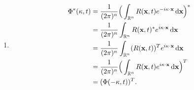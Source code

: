 \documentclass[mat2, tisk]{fmfdelo}
\newcommand{\R}{\mathbb R}
\newcommand{\bd}{\textbf}
\begin{document}
\begin{dokaz}
\hfill
\begin{enumerate}
  \item[i)] 
  \begin{align*}
  \Phi^*(\text{\bd{$\kappa$}}, t) &= \frac{1}{(2\pi)^n} \Big(\int_{\R^n} {R}(\bd{x}, t) e^{-i\text{\bd{$\kappa$}} \cdot \bd{x}} \dif \bd{x}\Big)^* \\
  &= \frac{1}{(2\pi)^n} \int_{\R^n} {R}(\bd{x}, t)^* e^{i\text{\bd{$\kappa$}} \cdot \bd{x}} \dif \bd{x} \\
  &= \frac{1}{(2\pi)^n} \int_{\R^n} ({R}(\bd{x}, t))^T e^{i\text{\bd{$\kappa$}} \cdot \bd{x}} \dif \bd{x} \\
  &= \frac{1}{(2\pi)^n} \Big(\int_{\R^n} {R}(\bd{x}, t) e^{i\text{\bd{$\kappa$}} \cdot \bd{x}} \dif \bd{x}\Big)^T \\
  &= (\Phi(-\text{\bd{$\kappa$}}, t))^T.
  \end{align*}


\end{enumerate}
\end{dokaz}
\end{document}
